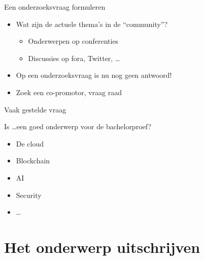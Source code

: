 \documentclass[usenames,dvipsnames]{beamer}
\begin{document}
\begin{frame}{Een onderzoeksvraag formuleren}
  
  \begin{itemize}
    \item Wat zijn de actuele thema's in de ``community''?
    \begin{itemize}
      \item Onderwerpen op conferenties
      \item Discussies op fora, Twitter, \ldots
    \end{itemize}
    \item Op een onderzoeksvraag is nu nog geen antwoord!
    \item Zoek een co-promotor, vraag raad
  \end{itemize}
  
\end{frame}

\begin{frame}{Vaak gestelde vraag}
  
  Is \ldots een goed onderwerp voor de bachelorproef?
  
  \begin{itemize}
    \item De cloud
    \item Blockchain
    \item AI
    \item Security
    \item \ldots
  \end{itemize}

\end{frame}

\section{Het onderwerp uitschrijven}
\sectionframe{}
\end{document}

